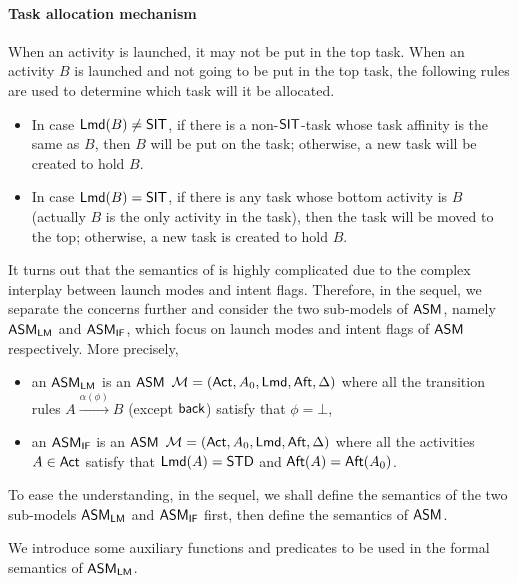 \paragraph{Task allocation mechanism} 
When an activity is launched, it may not be put in the top task. 
When an activity $B$ is launched and not going to be put in the top task, the following rules are used to determine which task will it be allocated. 
\begin{itemize}
	\item In case ${\sf Lmd}(B) \neq \mathsf{SIT}$, if there is a non-$\mathsf{SIT}$-task whose task affinity is the same as $B$, then $B$ will be put on the task; otherwise, a new task will be created to hold $B$.
 
	\item In case ${\sf Lmd}(B) = \mathsf{SIT}$,    if there is any task whose bottom activity is $B$ (actually $B$ is the only activity in the task), then the task will be moved to the top; otherwise, a new task is created to hold $B$.
\end{itemize}


It turns out that the semantics of {\AMASS} is highly complicated due to the complex interplay between launch modes and intent flags. Therefore, in the sequel, we separate the concerns further and consider the two sub-models of $\textsf{ASM}$, namely $\textsf{ASM}_\textsf{LM}$ and $\textsf{ASM}_\textsf{IF}$, which focus on launch modes and intent flags of $\textsf{ASM}$ respectively. 
More precisely, 
\begin{itemize}
	\item an $\textsf{ASM}_\textsf{LM}$ is an $\textsf{ASM}$ ${\mathcal{M} } = ({\sf Act}, A_0, {\sf Lmd}, {\sf Aft}, \Delta)$ where all the transition rules $A \xrightarrow{\alpha(\phi)} B$ (except ${\mathsf{back} }$) satisfy that $\phi = \bot$, 
	\item an $\textsf{ASM}_\textsf{IF}$ is an $\textsf{ASM}$ ${\mathcal{M} } = ({\sf Act}, A_0, {\sf Lmd}, {\sf Aft}, \Delta)$ where all the activities $A\in{\sf Act}$ satisfy that ${\sf Lmd}(A) = \mathsf{STD}$ and ${\sf Aft}(A) = {\sf Aft}(A_0)$.
\end{itemize}
To ease the understanding, in the sequel, we shall define the semantics of the two sub-models $\textsf{ASM}_\textsf{LM}$ and $\textsf{ASM}_\textsf{IF}$ first, then define the semantics of $\textsf{ASM}$. 


We introduce some auxiliary functions and predicates to be used in the formal semantics of $\textsf{ASM}_\textsf{LM}$.

	
